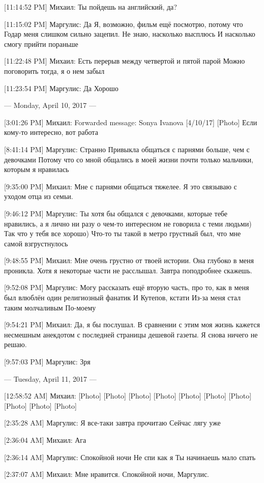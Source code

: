 \documentclass{article}
\begin{document}
[11:14:52 PM] Михаил:
Ты пойдешь на английский, да?

[11:15:02 PM] Маргулис:
Да
 Я, возможно, фильм ещё посмотрю, потому что Годар меня слишком сильно зацепил. Не знаю, насколько высплюсь
 И насколько смогу прийти пораньше

[11:22:48 PM] Михаил:
Есть перерыв между четвертой и пятой парой
 Можно поговорить тогда, я о нем забыл

[11:23:54 PM] Маргулис:
Да
 Хорошо

--- Monday, April 10, 2017 ---

[3:01:26 PM] Михаил:
Forwarded message: Sonya Ivanova [4/10/17] 
[Photo]
Если кому-то интересно, вот работа

[8:41:14 PM] Маргулис:
Странно
 Привыкла общаться с парнями больше, чем с девочками
 Потому что со мной общались в моей жизни почти только мальчики, которым я нравилась

[9:35:00 PM] Михаил:
Мне с парнями общаться тяжелее. Я это связываю с уходом отца из семьи.

[9:46:12 PM] Маргулис:
Ты хотя бы общался с девочками, которые тебе нравились, а я лично ни разу о чем-то интересном не говорила с теми людьми)
 Так что у тебя все хорошо)
 Что-то ты такой в метро грустный был, что мне самой взгрустнулось

[9:48:55 PM] Михаил:
Мне очень грустно от твоей истории.
 Она глубоко в меня проникла.
 Хотя я некоторые части не расслышал. Завтра поподробнее скажешь.

[9:52:08 PM] Маргулис:
Могу рассказать ещё вторую часть, про то, как в меня был влюблён один религиозный фанатик
 И Кутепов, кстати
 Из-за меня стал таким молчаливым
 По-моему

[9:54:21 PM] Михаил:
Да, я бы послушал. В сравнении с этим моя жизнь кажется несмешным анекдотом с последней страницы дешевой газеты.
 Я снова ничего не решаю.

[9:57:03 PM] Маргулис:
Зря

--- Tuesday, April 11, 2017 ---

[12:58:52 AM] Михаил:
[Photo]
 [Photo]
 [Photo]
 [Photo]
 [Photo]
 [Photo]
 [Photo]
 [Photo]
 [Photo]
 [Photo]

[2:35:28 AM] Маргулис:
Я все-таки завтра прочитаю
 Сейчас лягу уже

[2:36:04 AM] Михаил:
Ага

[2:36:14 AM] Маргулис:
Спокойной ночи
 Не спи как я
 Ты начинаешь мало спать

[2:37:07 AM] Михаил:
Мне нравится. Спокойной ночи, Маргулис.
\end{document}

